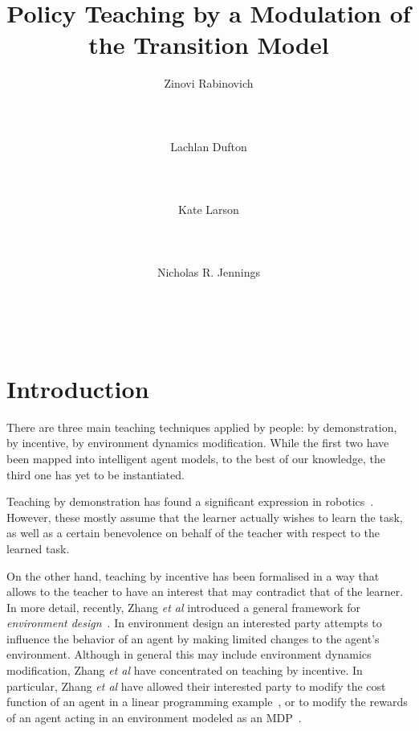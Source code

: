\documentclass[letterpaper]{aamas2010}
\author{\alignauthor Zinovi Rabinovich\\
  \affaddr{Electronics and Computer Science}\\
  \affaddr{University of Southampton}\\
  \affaddr{Southampton, United Kingdom}\\
  \email{zr@ecs.soton.ac.uk}
\alignauthor Lachlan Dufton\\ 
  \affaddr{Cheriton School of Computer Science}\\
  \affaddr{University of Waterloo}\\
  \affaddr{Waterloo, Canada}\\
  \email{ltdufton@cs.uwaterloo.ca}
\alignauthor Kate Larson\\
  \affaddr{Cheriton School of Computer Science}\\
  \affaddr{University of Waterloo}\\
  \affaddr{Waterloo, Canada}\\
  \email{klarson@cs.uwaterloo.ca}
\alignauthor Nicholas R. Jennings\\
  \affaddr{Electronics and Computer Science}\\
  \affaddr{University of Southampton}\\
  \affaddr{Southampton, United Kingdom}\\
  \email{nrj@ecs.soton.ac.uk}
}
\title{Policy  Teaching by a Modulation of the Transition Model}
\begin{document}
\maketitle

\section{Introduction}
\nocite{taylor_PhD_2008}
\nocite{taylor_stone_2009}
\nocite{fleming_hernandez-hernandez_CDC_97}
\nocite{todorov_2009_framework_sup}
\nocite{todorov_2009_framework}
\nocite{ng_russell_2000}
\nocite{zhang_parkes_2009_ed}
\nocite{dufton_larson_2009}
\nocite{banerjee_peng_2005}

There are three main teaching techniques applied by people: by
demonstration, by incentive, by environment dynamics
modification. While the
first two have been mapped into intelligent agent models, to the best
of our knowledge, the third one has yet to be instantiated.

Teaching by demonstration has found a significant expression in
robotics~\cite{argal_etal_2009}. However, these mostly assume that the
learner actually wishes to learn the task, as well as a certain
benevolence on behalf of the teacher with respect to the learned
task.

On the other hand, teaching by incentive has been formalised in a way
that allows to the teacher to have an interest that may contradict
that of the learner. In more detail, recently, Zhang \emph{et al}
introduced a general framework for \emph{environment
  design}~\cite{Zhang09:General}. In environment design an interested
party attempts to influence the behavior of an agent by making limited
changes to the agent's environment. Although in general this may
include environment dynamics modification, Zhang \emph{et al} have
concentrated on teaching by incentive. In particular, Zhang \emph{et
  al} have allowed their interested party to modify the cost function
of an agent in a linear programming example~\cite{Zhang09:General}, or
to modify the rewards of an agent acting in an environment modeled as
an MDP~\cite{zhang_parkes_2008,Zhang09:Policy}.
\end{document}
